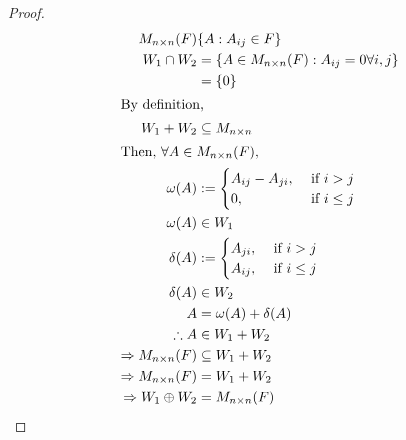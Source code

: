 \documentclass[12pt]{article}
\newenvironment{problem}[2][Problem]{\begin{trivlist}
\item[\hskip \labelsep {\bfseries #1}\hskip \labelsep {\bfseries #2.}]}{\end{trivlist}}
\begin{document}
\begin{problem}{29}
\end{problem}
\begin{proof}
\begin{align*}
M_{n \times n} (F) & \{A : A_{ij} \in F\} \\
W_1 \cap W_2 &= \{A \in M_{n \times n} (F) : A_{ij} = 0 \forall i, j \} \\
&= \{0\} \\
\shortintertext{By definition,}
W_1+W_2 &\subseteq M_{n \times n} \\
\shortintertext{Then, $\forall A \in M_{n \times n} (F) $,}
\omega (A) &:=  
\begin{cases}
	A_{ij} - A_{ji}, &\text{ if } i > j \\
	0, &\text{ if } i \le j
\end{cases} \\
\omega (A) &\in W_1 \\  
\delta (A) &:= 
\begin{cases}
	A_{ji}, &\text{ if } i > j \\
	A_{ij}, &\text{ if } i \le j
\end{cases} \\
\delta (A) &\in W_2 \\  
A &= \omega (A) + \delta (A) \\
\therefore A &\in W_1 + W_2 \\
\Rightarrow M_{n \times n} (F) &\subseteq W_1 + W_2 \\
\Rightarrow M_{n \times n} (F) &= W_1 + W_2 \\
\Rightarrow W_1 \oplus W_2 &= M_{n \times n} (F)
\end{align*}
\end{proof}
\filbreak
\end{document}
